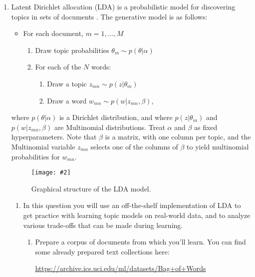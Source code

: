 \documentclass{article}
\newcommand{\widgraph}[2]{\texttt{[image: \#2]}}
\begin{document}
\begin{enumerate}
\item 
Latent Dirichlet allocation (LDA) is a probabilistic model for discovering topics in
sets of documents \cite{blei2003latent}.  The generative model is as follows:
\begin{itemize}
  \itemsep 5pt
  \item For each document, $m = 1, \ldots, M$
    \begin{enumerate}
      \item Draw topic probabilities $\theta_m \sim p(\theta | \alpha)$
      \item For each of the $N$ words:
        \begin{enumerate}
        \item Draw a topic $z_{mn} \sim p(z | \theta_m)$
        \item Draw a word $w_{mn} \sim p(w | z_{mn}, \beta)$,
        \end{enumerate}
    \end{enumerate}
\end{itemize}
where $p(\theta | \alpha)$ is a Dirichlet distribution, and where $p(z |
\theta_m)$ and $p(w | z_{mn}, \beta)$ are Multinomial distributions.  Treat
$\alpha$ and $\beta$ as fixed hyperparameters.
Note that $\beta$ is a matrix, with one column per topic, and the
Multinomial variable $z_{mn}$ selects one of the columns of $\beta$ to yield
multinomial probabilities for $w_{mn}$. 


\begin{figure}[t]
\begin{center}
  \widgraph{.5\textwidth}{lda}
\caption{Graphical structure of the LDA model.}
\end{center}
\end{figure}

\begin{enumerate}

\item In this question you will use an off-the-shelf implementation of
  LDA to get practice with learning topic models on real-world data,
  and to analyze various trade-offs that can be made during
  learning. 
\begin{enumerate}
\item Prepare a corpus of documents from which you'll learn. You can
  find some already prepared text collections here:

\begin{centering}\url{https://archive.ics.uci.edu/ml/datasets/Bag+of+Words}\end{centering}


\end{enumerate}
\end{enumerate}
\end{enumerate}
\end{document}

